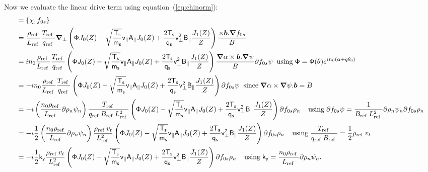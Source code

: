 \documentclass[10pt,a4paper]{article}
\newcommand{\dd}{\partial}
\newcommand{\grad}{{\bfm \nabla}}
\newcommand{\half}{\frac{1}{2}}
\newcommand{\bfm}[1]{\mbox{{\boldmath $ { #1}$}}}
\newcommand{\gradperp}{\bfm{\nabla}_{\perp}}
\newcommand{\n}[1]{{#1}_{\rm ref\;}}
\newcommand{\g}[1]{\mathsf{#1}}
\begin{document}
Now we evaluate the linear drive term using equation~(\ref{eq:chinorm}):
\begin{align*}
  [IV] & = \left\{ \chi, f_{0s}\right\} \\
  & = \frac{\n{\rho}}{\n{L}} \frac{\n{T}}{\n{q}} \gradperp \left( \g{\Phi}
    J_0(Z) - \sqrt{\frac{\g{T_s}}{\g{m_s}}} \g{v_{\parallel}}
    \g{A_{\parallel}} J_0(Z) + \frac{2 \g{T_s}}{\g{q_s}} \g{v_{\perp}^2}
    \g{B_{\parallel}}
    \frac{J_1(Z)}{Z} \right) \frac{\times \bfm{b} . \grad{f_{0s}}}{B} \\
  & = i n_0 \frac{\n{\rho}}{\n{L}} \frac{\n{T}}{\n{q}} \left( \g{\Phi} J_0(Z)
    - \sqrt{\frac{\g{T_s}}{\g{m_s}}} \g{v_{\parallel}} \g{A_{\parallel}}
    J_0(Z) + \frac{2 \g{T_s}}{\g{q_s}} \g{v_{\perp}^2} \g{B_{\parallel}}
    \frac{J_1(Z)}{Z} \right) \frac{\grad{\alpha} \times \bfm{b}
    . \grad{\psi}}{B} \dd{f_{0s}}{\psi} \;\;
  {\rm using} \; \g{\Phi}=\g{\Phi}(\theta) e^{i n_0 (\alpha + q \theta_0)} \\
  & = -i n_0 \frac{\n{\rho}}{\n{L}} \frac{\n{T}}{\n{q}} \left( \g{\Phi} J_0(Z)
    - \sqrt{\frac{\g{T_s}}{\g{m_s}}} \g{v_{\parallel}} \g{A_{\parallel}}
    J_0(Z) + \frac{2 \g{T_s}}{\g{q_s}} \g{v_{\perp}^2} \g{B_{\parallel}}
    \frac{J_1(Z)}{Z} \right) \dd{f_{0s}}{\psi} \;\;
  {\rm since}\; \grad{\alpha} \times \grad{\psi}. \bfm{b} = B\\
  & = -i \left( \frac{n_0 \n{\rho}}{\n{L}} \dd{\rho_n}{\psi_n} \right)
  \frac{\n{T}}{\n{q}\n{B}\n{L}^2} \left( \g{\Phi} J_0(Z) -
    \sqrt{\frac{\g{T_s}}{\g{m_s}}} \g{v_{\parallel}} \g{A_{\parallel}} J_0(Z)
    + \frac{2 \g{T_s}}{\g{q_s}} \g{v_{\perp}^2} \g{B_{\parallel}}
    \frac{J_1(Z)}{Z} \right) \dd{f_{0s}}{\rho_n} \;\; \;\; {\rm using}\;
  \dd{f_{0s}}{\psi} = \frac{1}{\n{B}\n{L}^{2}}
  \dd{\rho_n}{\psi_n} \dd{f_{0s}}{\rho_n}  \\
  & = -i \half \left( \frac{n_0 \n{\rho}}{\n{L}} \dd{\rho_n}{\psi_n} \right)
  \frac{\n{\rho} v_t}{\n{L}^2} \left( \g{\Phi} J_0(Z) -
    \sqrt{\frac{\g{T_s}}{\g{m_s}}} \g{v_{\parallel}} \g{A_{\parallel}} J_0(Z)
    + \frac{2 \g{T_s}}{\g{q_s}} \g{v_{\perp}^2} \g{B_{\parallel}}
    \frac{J_1(Z)}{Z} \right) \dd{f_{0s}}{\rho_n} \;\;
  \;\; {\rm using}\; \frac{\n{T}}{\n{q} \n{B}} = \half \n{\rho} v_t \\
  & = -i \half \g{k_y} \frac{\n{\rho} v_t}{\n{L}^2} \left( \g{\Phi} J_0(Z) -
    \sqrt{\frac{\g{T_s}}{\g{m_s}}} \g{v_{\parallel}} \g{A_{\parallel}} J_0(Z)
    + \frac{2 \g{T_s}}{\g{q_s}} \g{v_{\perp}^2} \g{B_{\parallel}}
    \frac{J_1(Z)}{Z} \right) \dd{f_{0s}}{\rho_n} \;\; \;\; {\rm using}\;
  \g{k_y} = \frac{n_0 \n{\rho}}{\n{L}} \dd{\rho_n}{\psi_n}.
\end{align*}
\end{document}
